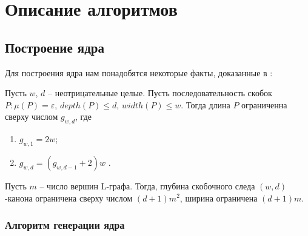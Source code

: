\chapter{Описание алгоритмов} \label{chapter2} 


\section{Построение ядра}
Для построения ядра нам понадобятся некоторые факты, доказанные в \cite{stan1}:

\begin{theorem}
    \label{canon_length_limit_theorem}
    Пусть $w$, $d$ -- неотрицательные целые. Пусть последовательность скобок $P : \mu(P)=\varepsilon$, $depth(P) \leq d$, $width(P) \leq w$. 
    Тогда длина $P$ ограниченна сверху числом $g_{w,d}$, где 
    \begin{enumerate}
        \item $g_{w,1} = 2w$;
        \item $g_{w,d} = (g_{w,d-1} + 2)w$ .
    \end{enumerate}
\end{theorem}
\begin{lemma}
    \label{wd_upper_limit_lemma}
    Пусть $m$ -- число вершин L-графа. Тогда, глубина скобочного следа $(w,d)$-канона ограничена сверху числом $(d+1)m^2$, ширина ограничена $(d+1)m$.
\end{lemma}

\subsection*{Алгоритм генерации ядра}

